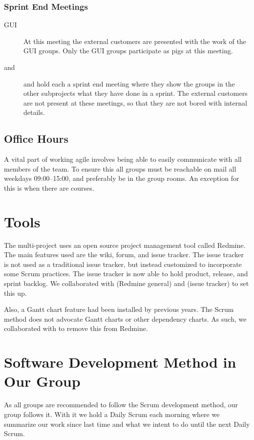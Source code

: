 \subsubsection{Sprint End Meetings}
\begin{description}
  \item[GUI] At this meeting the external customers are presented with the work of the GUI groups. Only the GUI groups participate as pigs at this meeting.
  \item[\db and \bd] \db and \bd hold each a sprint end meeting where they show the groups in the other subprojects what they have done in a sprint. The external customers are not present at these meetings, so that they are not bored with internal details.
\end{description}

\subsection{Office Hours}
A vital part of working agile involves being able to easily communicate with all members of the team. To ensure this all groups must be reachable on mail all weekdays 09:00--15:00, and preferably be in the group rooms. An exception for this is when there are courses.

\section{Tools}\label{sec:redmine}
The multi-project uses an open source project management tool called Redmine. The main features used are the wiki, forum, and issue tracker. The issue tracker is not used as a traditional issue tracker, but instead customized to incorporate some Scrum practices. The issue tracker is now able to hold product, release, and sprint backlog. We collaborated with  (Redmine general) and  (issue tracker) to set this up. 

Also, a Gantt chart feature had been installed by previous years. The Scrum method does not advocate Gantt charts or other dependency charts. As such, we collaborated with  to remove this from Redmine.

\section{Software Development Method in Our Group}\label{sec:swmethod_ourgroup}
As all groups are recommended to follow the Scrum development method, our group follows it. With it we hold a Daily Scrum each morning where we summarize our work since last time and what we intent to do until the next Daily Scrum.

